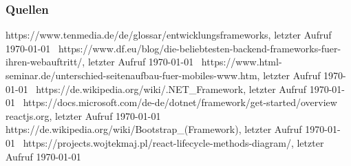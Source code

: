 \documentclass[aspectratio=169,14pt,xcolor=dvipsnames]{beamer}
\begin{document}
\begin{frame}[t]
    \frametitle{Quellen}
    \scriptsize https://www.tenmedia.de/de/glossar/entwicklungsframeworks, \newline letzter Aufruf \today\ \currenttime \newline \newline
    \scriptsize https://www.df.eu/blog/die-beliebtesten-backend-frameworks-fuer-ihren-webauftritt/, \newline letzter Aufruf \today\  \currenttime \newline \newline
    \scriptsize https://www.html-seminar.de/unterschied-seitenaufbau-fuer-mobiles-www.htm, \newline letzter Aufruf \today\  \currenttime \newline \newline
    \scriptsize https://de.wikipedia.org/wiki/.NET\_Framework, \newline letzter Aufruf \today\  \currenttime \newline \newline
    \scriptsize https://docs.microsoft.com/de-de/dotnet/framework/get-started/overview
    reactjs.org, \newline letzter Aufruf \today\ \currenttime \newline \newline
    \scriptsize https://de.wikipedia.org/wiki/Bootstrap\_(Framework), \newline letzter Aufruf \today\  \currenttime \newline \newline
    \scriptsize https://projects.wojtekmaj.pl/react-lifecycle-methods-diagram/, \newline letzter Aufruf \today\  \currenttime \newline \newline
\end{frame}
\end{document}
